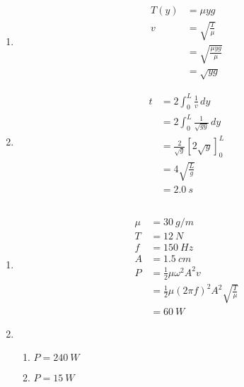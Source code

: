 \documentclass{article}
\begin{document}

\subsection{}

\begin{enumerate}
  \item

        \begin{align*}
          T(y) & = \mu y g                    \\
          v    & = \sqrt{\frac{T}{\mu}}       \\
               & = \sqrt{\frac{\mu y g}{\mu}} \\
               & = \sqrt{y g}
        \end{align*}

  \item

        \begin{align*}
          t & = 2 \int_0^L \frac{1}{v} \,dy          \\
            & = 2 \int_0^L \frac{1}{\sqrt{g y}} \,dy \\
            & = \frac{2}{\sqrt{g}} [2 \sqrt{y}]_0^L  \\
            & = 4 \sqrt{\frac{L}{g}}                 \\
            & = \qty{2.0}{s}
        \end{align*}
\end{enumerate}

\subsection{}

\begin{enumerate}
  \item

        \begin{align*}
          \mu & = \qty{30}{g/m}                                        \\
          T   & = \qty{12}{N}                                          \\
          f   & = \qty{150}{Hz}                                        \\
          A   & = \qty{1.5}{cm}                                        \\
          P   & = \frac{1}{2} \mu \omega^2 A^2 v                       \\
              & = \frac{1}{2} \mu (2 \pi f)^2 A^2 \sqrt{\frac{T}{\mu}} \\
              & = \qty{60}{W}
        \end{align*}

  \item

        \begin{enumerate}
          \item $P = \qty{240}{W}$

          \item $P = \qty{15}{W}$
        \end{enumerate}
\end{enumerate}
\end{document}
